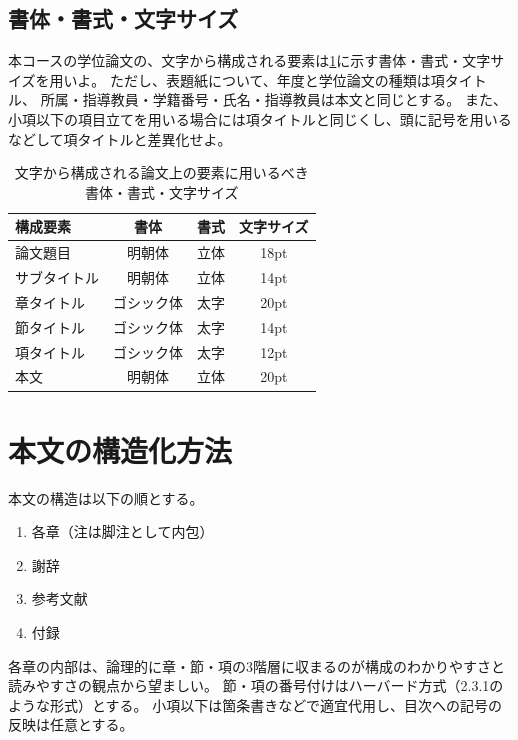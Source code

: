 		\subsection{書体・書式・文字サイズ}
			\label{sub:font}

			本コースの学位論文の、文字から構成される要素は\cref{tab:font}に示す書体・書式・文字サイズを用いよ。
			ただし、表題紙について、年度と学位論文の種類は項タイトル、
			所属・指導教員・学籍番号・氏名・指導教員は本文と同じとする。
			また、小項以下の項目立てを用いる場合には項タイトルと同じくし、頭に記号を用いるなどして項タイトルと差異化せよ。

			\begin{table}[tb]
				\caption{文字から構成される論文上の要素に用いるべき書体・書式・文字サイズ}
				\label{tab:font}
				\centering

				\begin{tabular}{l|ccc}
				\hline

				\hline
				\textbf{構成要素} & \textbf{書体} & \textbf{書式} & \textbf{文字サイズ}\\
				\hline
					論文題目 & 明朝体 & 立体 & 18pt \\
					サブタイトル & 明朝体 & 立体 & 14pt \\
					章タイトル & ゴシック体 & 太字 & 20pt \\
					節タイトル & ゴシック体 & 太字 & 14pt \\
					項タイトル & ゴシック体 & 太字 & 12pt \\
					本文 & 明朝体 & 立体 & 20pt \\
				\hline

				\hline
				\end{tabular}
			\end{table}

	\section{本文の構造化方法}
		\label{sec:structure}

		本文の構造は以下の順とする。

		\begin{enumerate}
			\item 各章（注は脚注として内包）
			\item 謝辞
			\item 参考文献
			\item 付録
		\end{enumerate}

		各章の内部は、論理的に章・節・項の3階層に収まるのが構成のわかりやすさと読みやすさの観点から望ましい。
		節・項の番号付けはハーバード方式（2.3.1のような形式）とする。
		小項以下は箇条書きなどで適宜代用し、目次への記号の反映は任意とする。

